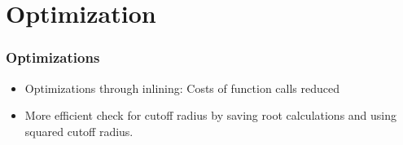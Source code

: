
\section{Optimization}
\label{sec:opt}

\begin{frame}
    \frametitle{Optimizations}
    \begin{itemize}
        \item Optimizations through inlining: Costs of function calls reduced
        \item More efficient check for cutoff radius by saving root calculations and using squared cutoff radius.
    \end{itemize}
\end{frame}